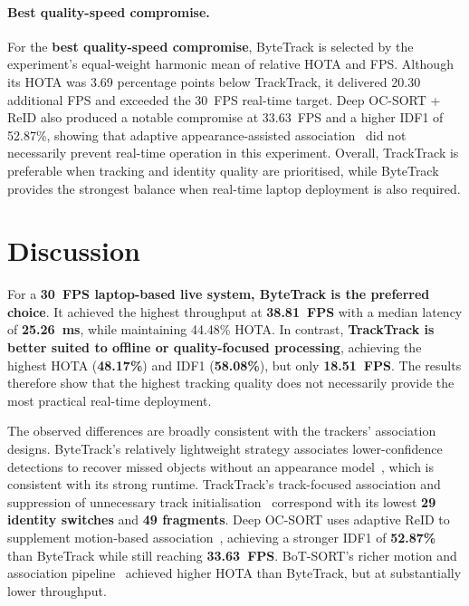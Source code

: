 \documentclass[11pt,a4paper]{article}
\begin{document}
\paragraph{Best quality-speed compromise.} For the \textbf{best quality-speed compromise}, ByteTrack is selected by the experiment's equal-weight harmonic mean of relative HOTA and FPS. Although its HOTA was 3.69 percentage points below TrackTrack, it delivered 20.30 additional FPS and exceeded the 30~FPS real-time target. Deep OC-SORT + ReID also produced a notable compromise at 33.63~FPS and a higher IDF1 of 52.87\%, showing that adaptive appearance-assisted association~\cite{maggiolino2023deepocsort} did not necessarily prevent real-time operation in this experiment. Overall, TrackTrack is preferable when tracking and identity quality are prioritised, while ByteTrack provides the strongest balance when real-time laptop deployment is also required.

\section{Discussion}

For a \textbf{30~FPS laptop-based live system, ByteTrack is the preferred choice}. It achieved the highest throughput at \textbf{38.81~FPS} with a median latency of \textbf{25.26~ms}, while maintaining 44.48\% HOTA. In contrast, \textbf{TrackTrack is better suited to offline or quality-focused processing}, achieving the highest HOTA (\textbf{48.17\%}) and IDF1 (\textbf{58.08\%}), but only \textbf{18.51~FPS}. The results therefore show that the highest tracking quality does not necessarily provide the most practical real-time deployment.

The observed differences are broadly consistent with the trackers' association designs. ByteTrack's relatively lightweight strategy associates lower-confidence detections to recover missed objects without an appearance model~\cite{zhang2022bytetrack}, which is consistent with its strong runtime. TrackTrack's track-focused association and suppression of unnecessary track initialisation~\cite{shim2025tracktrack} correspond with its lowest \textbf{29 identity switches} and \textbf{49 fragments}. Deep OC-SORT uses adaptive ReID to supplement motion-based association~\cite{maggiolino2023deepocsort}, achieving a stronger IDF1 of \textbf{52.87\%} than ByteTrack while still reaching \textbf{33.63~FPS}. BoT-SORT's richer motion and association pipeline~\cite{aharon2022botsort} achieved higher HOTA than ByteTrack, but at substantially lower throughput.
\end{document}
